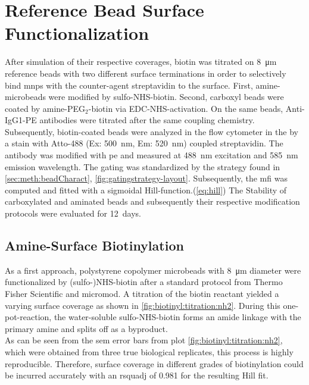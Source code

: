 \section{Reference Bead Surface Functionalization}
\label{sec:res:beadFunc}
After simulation of their respective coverages, biotin was titrated on \SI{8}{\micro\meter} reference beads with two different surface terminations in order to selectively bind \glspl{mnp} with the counter-agent streptavidin to the surface. First, \gls{amine}-microbeads were modified by sulfo-NHS-biotin. Second, \gls{carboxyl} beads were coated by amine-PEG$_2$-biotin via EDC-NHS-activation. On the same beads, Anti-IgG1-PE antibodies were titrated after the same coupling chemistry.\\
Subsequently, biotin-coated beads were analyzed in the flow cytometer in the by a stain with Atto-488 (Ex: \SI{500}{\nano\meter}, Em: \SI{520}{\nano\meter}) coupled streptavidin. The antibody was modified with \gls{pe} and measured at \SI{488}{\nano\meter} excitation and \SI{585}{\nano\meter}  emission wavelength. The gating was standardized by the strategy found in \cref{sec:meth:beadCharact}, \cref{fig:gatingstrategy-layout}. Subsequently, the \gls{mfi} was computed and fitted with a sigmoidal Hill-function.(\cref{eq:hill}) The Stability of carboxylated and aminated beads and subsequently their respective modification protocols were evaluated for \SI{12}{days}.


\subsection{Amine-Surface Biotinylation}
As a first approach, polystyrene copolymer microbeads with \SI{8}{\micro\meter} diameter were functionalized by (sulfo-)NHS-biotin after a standard protocol from Thermo Fisher Scientific and micromod. A titration of the biotin reactant yielded a varying surface coverage as shown in \cref{fig:biotinyl:titration:nh2}. During this one-pot-reaction, the water-soluble sulfo-NHS-biotin forms an \gls{amide} linkage with the primary \gls{amine} and  splits off as a byproduct.\\
As can be seen from the \gls{sem} error bars from plot \ref{fig:biotinyl:titration:nh2}, which were obtained from three true biological replicates, this process is highly reproducible. Therefore, surface coverage in different grades of biotinylation could be incurred accurately with an \gls{rsquadj} of \num{0.981} for the resulting Hill fit.

